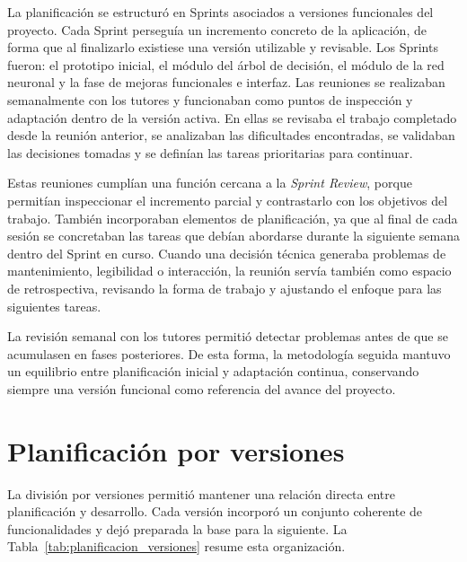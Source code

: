 La planificación se estructuró en Sprints asociados a versiones funcionales del proyecto.
Cada Sprint perseguía un incremento concreto de la aplicación, de forma que al finalizarlo existiese una versión utilizable y revisable.
Los Sprints fueron: el prototipo inicial, el módulo del árbol de decisión, el módulo de la red neuronal y la fase de mejoras funcionales e interfaz.
Las reuniones se realizaban semanalmente con los tutores y funcionaban como puntos de inspección y adaptación dentro de la versión activa.
En ellas se revisaba el trabajo completado desde la reunión anterior, se analizaban las dificultades encontradas, se validaban las decisiones tomadas y se definían las tareas prioritarias para continuar.

Estas reuniones cumplían una función cercana a la \textit{Sprint Review}, porque permitían inspeccionar el incremento parcial y contrastarlo con los objetivos del trabajo.
También incorporaban elementos de planificación, ya que al final de cada sesión se concretaban las tareas que debían abordarse durante la siguiente semana dentro del Sprint en curso.
Cuando una decisión técnica generaba problemas de mantenimiento, legibilidad o interacción, la reunión servía también como espacio de retrospectiva, revisando la forma de trabajo y ajustando el enfoque para las siguientes tareas.

La revisión semanal con los tutores permitió detectar problemas antes de que se acumulasen en fases posteriores.
De esta forma, la metodología seguida mantuvo un equilibrio entre planificación inicial y adaptación continua, conservando siempre una versión funcional como referencia del avance del proyecto.

\section{Planificación por versiones}
\label{sec:planificacion_versiones}

La división por versiones permitió mantener una relación directa entre planificación y desarrollo.
Cada versión incorporó un conjunto coherente de funcionalidades y dejó preparada la base para la siguiente.
La Tabla~\ref{tab:planificacion_versiones} resume esta organización.

